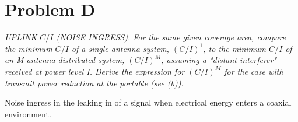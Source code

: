 \section{Problem D}
\textit{ UPLINK $C/I$ (NOISE INGRESS). For the same given coverage area, compare the minimum $C/I$ of a single 
antenna system, $(C/I)^1$, to the minimum $C/I$ of an M-antenna distributed system, $(C/I)^M$, assuming a "distant 
interferer" received at power level I. Derive the expression for $(C/I)^M$ for the case with transmit power 
reduction at the portable (see (b)).}

Noise ingress in the leaking in of a signal when electrical energy enters a coaxial environment. 